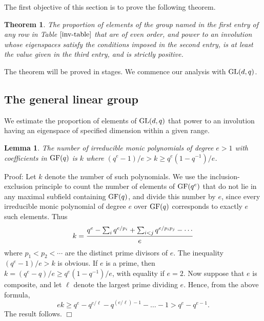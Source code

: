 \documentclass[12pt]{article}
\newtheorem{lemma}[definition]{Lemma}
\newtheorem{theorem}[definition]{Theorem}
\newenvironment{proof}{\normalsize {\sc Proof}:}{{\hfill $\Box$ \\}}
\def\GL{{\rm GL}}
\def\GF{{\rm GF}}
\begin{document}
The first objective of this section is to prove the following theorem.
\begin{theorem}  \label{proportions} The proportion of elements 
of the group named in the first entry of 
any row in Table $\ref{inv-table}$ that 
are of even order, and power to an involution whose eigenspaces satisfy 
the conditions imposed in the second entry, is at least 
the value given in the third entry, and is strictly positive.
\end{theorem}
The theorem will be proved in stages. We commence
our analysis with $\GL(d, q)$. 

\subsection{The general linear group} \label{prop-gl} 
We estimate the proportion of elements of
$\GL(d,q)$ that power to an involution having an eigenspace
of specified dimension within a given range.

\begin{lemma}\label{monic} 
The number of irreducible monic polynomials of degree
$e>1$ with coefficients in $\GF(q)$ is $k$ where
$(q^e-1)/e>k\ge q^e(1-q^{-1})/e$.
\end{lemma}
\begin{proof}
Let $k$ denote the number of such polynomials.
We use the inclusion-exclusion principle to count the
number of elements of $\GF(q^e)$ that do not lie in any  maximal
subfield containing $\GF(q)$, and divide this number by $e$, since
every irreducible monic polynomial of degree $e$ over $\GF(q)$ corresponds
to exactly $e$ such elements.  Thus 
$$k = {q^e-\sum_iq^{e/p_i}+\sum_{i<j}q^{e/p_ip_j}-\cdots\over e}$$ 
where $p_1<p_2<\cdots$ are the distinct prime divisors of $e$. 
The inequality $(q^e-1)/e >k$ is obvious.  If $e$ is a prime,
then $k=(q^e-q)/e\ge q^e(1-q^{-1})/e$, with equality if $e=2$.
Now suppose that $e$ is composite, and let $\ell$ denote the largest prime
dividing $e$.  Hence, from the above formula, 
$$ek \ge q^e-q^{e/\ell}-q^{(e/\ell)-1}-\ldots -1>q^e - q^{e-1}.$$
The result follows.
\end{proof}
\end{document}
